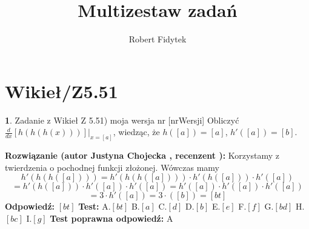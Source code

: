 \documentclass[12pt, a4paper]{article}
\title{Multizestaw zadań}
\author{Robert Fidytek}
\date{}
\theoremstyle{definition} %
\newtheorem{zad}{}
\newcommand{\kategoria}[1]{\section{#1}} %
\newcommand{\zadStart}[1]{\begin{zad}#1\newline} %
\newcommand{\zadStop}{\end{zad}}   %
\newcommand{\rozwStart}[2]{\noindent \textbf{Rozwiązanie (autor #1 , recenzent #2): }\newline} %
\newcommand{\rozwStop}{\newline}                                            %
\newcommand{\odpStart}{\noindent \textbf{Odpowiedź:}\newline}    %
\newcommand{\odpStop}{\newline}                                             %
\newcommand{\testStart}{\noindent \textbf{Test:}\newline} %
\newcommand{\testStop}{\newline} %
\newcommand{\kluczStart}{\noindent \textbf{Test poprawna odpowiedź:}\newline} %
\newcommand{\kluczStop}{\newline} %
\begin{document}
\maketitle


\kategoria{Wikieł/Z5.51}
\zadStart{Zadanie z Wikieł Z 5.51) moja wersja nr [nrWersji]}
Obliczyć $\frac{d}{dx}\left[h(h(h(x)))\right]|_{x=[a]}$, wiedząc, że $h([a])=[a]$, $h'([a])=[b]$.
\zadStop
\rozwStart{Justyna Chojecka}{}
Korzystamy z twierdzenia o pochodnej funkcji złożonej. Wówczas mamy
$$h'(h(h([a])))=h'(h(h([a])))\cdot h'(h([a]))\cdot h'([a])$$$$=h'(h([a]))\cdot h'([a])\cdot h'([a])=h'([a])\cdot h'([a])\cdot h'([a])$$$$=3\cdot h'([a])=3 \cdot ([b])=[bt]$$
\rozwStop
\odpStart
$[bt]$
\odpStop
\testStart
A.$[bt]$
B.$[a]$
C.$[d]$
D.$[b]$
E.$[e]$
F.$[f]$
G.$[bd]$
H.$[bc]$
I.$[g]$
\testStop
\kluczStart
A
\kluczStop
\end{document}
